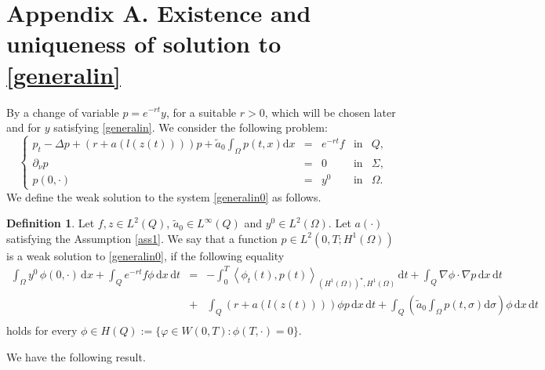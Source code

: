 \documentclass[reqno,twoside]{amsart}
\numberwithin{equation}{section}
\theoremstyle{definition}
\newtheorem{definition}[theorem]{Definition}
\numberwithin{equation}{section}
\def \dis {\displaystyle}
\def \dx{\mathrm{d}x}
\def \dt{\mathrm{d}t}
\def \dq {\mathrm{d}x \, \mathrm{d}t}
\def \d {\mathrm{d}}
\begin{document}
\section*{Appendix A. Existence and uniqueness of solution to \eqref{generalin}}
By a change of variable $p=e^{-rt}y$, for a suitable $r>0$, which will be chosen later and for $y$ satisfying \eqref{generalin}. We consider the following problem:
\begin{equation}\label{generalin0}
\left\{
\begin{array}{rllll}
	\dis p_t-\Delta p+(r+a(l(z(t))))p+\tilde{a}_0\int_{\Omega}p(t,x)\dx &=& e^{-rt}f &\mbox{in}& Q,\\
	\dis \partial_{\nu}p&=&0  &\mbox{in}& \Sigma,\\
	p(0,\cdot)&=& y^0 &\mbox{in}& \Omega.
\end{array}
\right.
\end{equation}
We define the weak solution to the system \eqref{generalin0} as follows.
\begin{definition}\label{weakgenelin0}
Let $f,z\in L^2(Q)$, $\tilde{a}_0\in L^\infty(Q)$ and $y^{0}\in L^2(\Omega)$. Let $a(\cdot)$  satisfying the Assumption \ref{ass1}.  We say that a function $p\in L^2(0,T;H^1(\Omega))$  is a weak solution to \eqref{generalin0}, if the following equality
\begin{equation}\label{weakgenlin0}
	\begin{array}{lll}
		\dis \int_\Omega y^0\,\phi(0,\cdot)\, \dx+\int_{Q}e^{-rt}f\phi\,\dq&=&\dis -\int_{0}^{T} \left\langle \phi_t(t),p(t)\right\rangle_{(H^{1}(\Omega))^\star,H^1(\Omega)} \, \dt+ \int_Q \nabla \phi\cdot\nabla p\, \dq\\
		&+&\dis \int_Q( r+a\left(l(z(t))\right)) \phi p\, \dq+\dis \int_Q\left(\tilde{a}_0 \dis \int_{\Omega}p(t,\sigma)\d\sigma\right)\phi\, \dq\\
	\end{array}
\end{equation}
holds for every $\phi \in H(Q):=\{\varphi\in W(0,T): \phi(T,\cdot)=0\}$.
\end{definition}
We have the following result.
\end{document}
